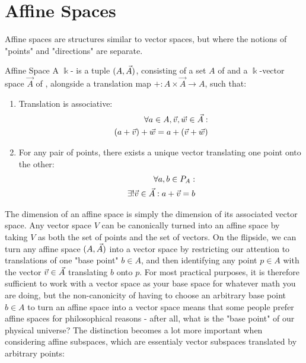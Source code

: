 \chapter{Affine Spaces}
Affine spaces are structures similar to vector spaces, but where the notions of "points" and "directions" are separate.
\begin{importantdefinition}{Affine Space}{}
	A $\Bbbk$- is a tuple $(A, \vec{A})$, consisting of a set $A$ of  and a $\Bbbk$-vector space $\vec A$ of , alongside a translation map $+ : A \times \vec A \to A$, such that:
	\begin{enumerate}
		\item Translation is associative:
		\begin{align*}
			\forall a \in A, \vec{v},\vec{w} \in \vec{A}:\\
			(a + \vec{v}) + \vec{w} = a + (\vec{v} + \vec{w})
		\end{align*}
		\item For any pair of points, there exists a unique vector translating one point onto the other:
		\begin{align*}
			\forall a,b \in P_A:\\
			\exists! \vec{v} \in \vec{A} : a + \vec{v} = b
		\end{align*}
	\end{enumerate}
\end{importantdefinition}
The dimension of an affine space is simply the dimension of its associated vector space. 
\newpar
Any vector space $V$ can be canonically turned into an affine space by taking $V$ as both the set of points and the set of vectors. On the flipside, we can turn any affine space $(A, \vec{A})$ into a vector space by restricting our attention to translations of one "base point" $b \in A$, and then identifying any point $p \in A$ with the vector $\vec{v} \in \vec{A}$ translating $b$ onto $p$.
\newpar
For most practical purposes, it is therefore sufficient to work with a vector space as your base space for whatever math you are doing, but the non-canonicity of having to choose an arbitrary base point $b \in A$ to turn an affine space into a vector space means that some people prefer affine spaces for philosophical reasons - after all, what is the "base point" of our physical universe?
\newpar
The distinction becomes a lot more important when considering affine subspaces, which are essentialy vector subspaces translated by arbitrary points:
